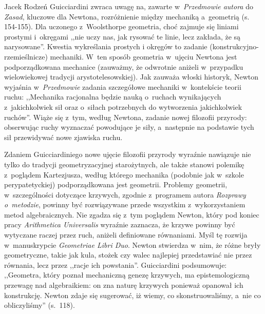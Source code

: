 \begin{recplenv}{Jacek Rodzeń}
Guicciardini zwraca uwagę na, zawarte w~\textit{Przedmowie autora} do \textit{Zasad}, kluczowe dla Newtona,
rozróżnienie między mechaniką a~geometrią (s. 154-155). Dla uczonego z~Woolsthorpe geometria, choć zajmuje się liniami
prostymi i~okręgami ,,nie uczy nas, jak rysować te linie, lecz zakłada, że są narysowane''. Kwestia wykreślania prostych
i okręgów to zadanie (konstrukcyjno-rzemieślnicze) mechaniki. W~ten sposób geometria w~ujęciu Newtona jest
podporządkowana mechanice (zauważmy, że odwrotnie aniżeli w~przypadku wielowiekowej tradycji arystotelesowskiej). Jak
zauważa włoski historyk, Newton wyjaśnia w~\textit{Przedmowie} zadania szczegółowe mechaniki w~kontekście teorii ruchu:
,,Mechanika racjonalna będzie nauką o~ruchach wynikających z~jakichkolwiek sił oraz o~siłach potrzebnych do wytworzenia
jakichkolwiek ruchów''. Wiąże się z~tym, według Newtona, zadanie nowej filozofii przyrody: obserwując ruchy wyznaczać
powodujące je siły, a~następnie na podstawie tych sił przewidywać nowe zjawiska ruchu. 

Zdaniem Guicciardiniego nowe ujęcie filozofii przyrody wyraźnie nawiązuje nie tylko do tradycji geometryzacyjnej
starożytnych, ale także stanowi polemikę z~poglądem Kartezjusza, według którego mechanika (podobnie jak w~szkole
perypatetyckiej) podporządkowana jest geometrii. Problemy geometrii, w~szczególności dotyczące krzywych,
zgodnie z~programem autora \textit{Rozprawy o~metodzie}, powinny być rozwiązywane przede wszystkim z~wykorzystaniem metod
algebraicznych. Nie zgadza się z~tym poglądem Newton, który pod koniec pracy \textit{Arithmetica Universalis} wyraźnie
zaznacza, że krzywe powinny być wytyczane raczej przez ruch, aniżeli definiowane równaniami. Myśl tę
rozwija w~manuskrypcie \textit{Geometriae Libri Duo}. Newton stwierdza w~nim, że różne bryły geometryczne,
takie jak kula, stożek
czy walec najlepiej przedstawiać nie przez równania, lecz przez ,,racje ich powstania''. Guicciardini podsumowuje:
,,Geometra, który poznał mechaniczną genezę krzywych, ma epistemologiczną przewagę nad algebraikiem: on zna naturę
krzywych ponieważ opanował ich konstrukcję. Newton zdaje się sugerować, iż wiemy, co skonstruowaliśmy, a~nie co
obliczyliśmy'' (s.~118).


\end{recplenv}
